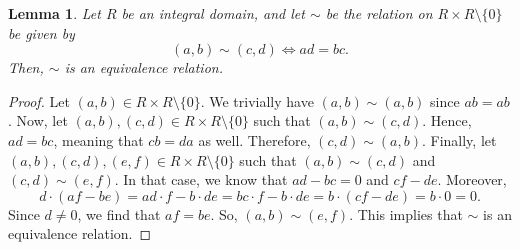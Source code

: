 \documentclass[a4paper, openany]{memoir}
\theoremstyle{definition}
\theoremstyle{plain}
\newtheorem{lemma}[definition]{Lemma}
\begin{document}
    \begin{lemma}
        Let $R$ be an integral domain, and let $\sim$ be the relation on $R \times R \setminus \{0\}$ be given by 
        \[(a, b) \sim (c, d) \iff ad = bc.\]
        Then, $\sim$ is an equivalence relation.
    \end{lemma}
    \begin{proof}
        Let $(a, b) \in R \times R \setminus \{0\}$. We trivially have $(a, b) \sim (a, b)$ since $ab = ab$. Now, let $(a, b), (c, d) \in R \times R \setminus \{0\}$ such that $(a, b) \sim (c, d)$. Hence, $ad = bc$, meaning that $cb = da$ as well. Therefore, $(c, d) \sim (a, b)$. Finally, let $(a, b), (c, d), (e, f) \in R \times R \setminus \{0\}$ such that $(a, b) \sim (c, d)$ and $(c, d) \sim (e, f)$. In that case, we know that $ad - bc = 0$ and $cf - de$. Moreover,
        \[d \cdot (af - be) = ad \cdot f - b \cdot de = bc \cdot f - b \cdot de = b \cdot (cf - de) = b \cdot 0 = 0.\]
        Since $d \neq 0$, we find that $af = be$. So, $(a, b) \sim (e, f)$. This implies that $\sim$ is an equivalence relation.
    \end{proof}
\end{document}
